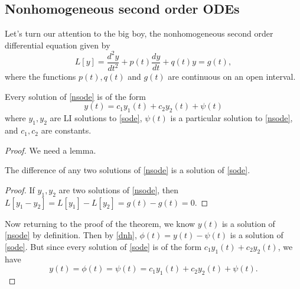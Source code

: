 \subsection{Nonhomogeneous second order ODEs}
Let's turn our attention to the big boy, the nonhomogeneous second order differential equation given by
\begin{equation}\label{nsode}
    L[y]=\frac{d^2y}{dt^2}+p(t) \frac{dy}{dt}+q(t)y=g(t),
\end{equation}
where the functions $p(t),q(t)$ and $g(t)$ are continuous on an open interval.
\begin{theorem}
    Every solution of \cref{nsode} is of the form \[
        y(t)=c_1y_1(t)+c_2y_2(t)+\psi(t)
    \] where $y_1,y_2$ are LI solutions to \cref{sode}, $\psi(t)$ is a particular solution to \cref{nsode}, and $c_1,c_2$ are constants.
\end{theorem}
\begin{proof}
    We need a lemma.
    \begin{lemma}\label{dnh}
    The difference of any two solutions of \cref{nsode} is a solution of \cref{sode}.
\end{lemma}
\begin{proof}
    If $y_1,y_2$ are two solutions of \cref{nsode}, then $L[y_1-y_2]=L[y_1]-L[y_2]=g(t)-g(t)=0.$
\end{proof}
Now returning to the proof of the theorem, we know $y(t)$ is a solution of \cref{nsode} by definition. Then by \cref{dnh}, $\phi (t)=y(t)-\psi(t)$ is a solution of \cref{sode}. But since every solution of \cref{sode} is of the form $c_1y_1(t)+c_2y_2(t)$, we have \[
    y(t)=\phi(t)=\psi(t)=c_1y_1(t)+c_2y_2(t)+\psi(t).
\] 
\end{proof}
